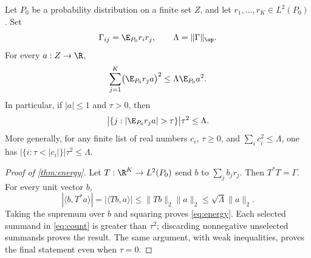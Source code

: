 \begin{lemma}\label{thm:energy}
Let $P_0$ be a probability distribution on a finite set $Z$, and let $r_1,\ldots,r_K\in L^2(P_0)$. Set
\[
 \Gamma_{ij}=\E_{P_0}r_i r_j,\qquad \Lambda=\|\Gamma\|_\op.
\]
For every $a:Z\to\R$,
\begin{equation}\label{eq:energy}
 \sum_{j=1}^K\bigl(\E_{P_0}r_j a\bigr)^2
 \leq\Lambda\E_{P_0}a^2.
\end{equation}
In particular, if $|a|\leq1$ and $\tau>0$, then
\begin{equation}\label{eq:count}
 \bigl|\{j:|\E_{P_0}r_j a|>\tau\}\bigr|\tau^2\leq\Lambda.
\end{equation}
More generally, for any finite list of real numbers $c_i$, $\tau\geq0$, and $\sum_i c_i^2\leq\Lambda$, one has $|\{i:\tau<|c_i|\}|\tau^2\leq\Lambda$.
\end{lemma}

\begin{proof}[Proof of \cref{thm:energy}]
Let $T:\R^K\to L^2(P_0)$ send $b$ to $\sum_jb_jr_j$. Then $T^*T=\Gamma$. For every unit vector $b$,
\[
 |\langle b,T^*a\rangle|=|\langle Tb,a\rangle|
 \leq\|Tb\|_2\|a\|_2\leq\sqrt\Lambda\|a\|_2.
\]
Taking the supremum over $b$ and squaring proves \eqref{eq:energy}. Each selected summand in \eqref{eq:count} is greater than $\tau^2$; discarding nonnegative unselected summands proves the result. The same argument, with weak inequalities, proves the final statement even when $\tau=0$.
\end{proof}
